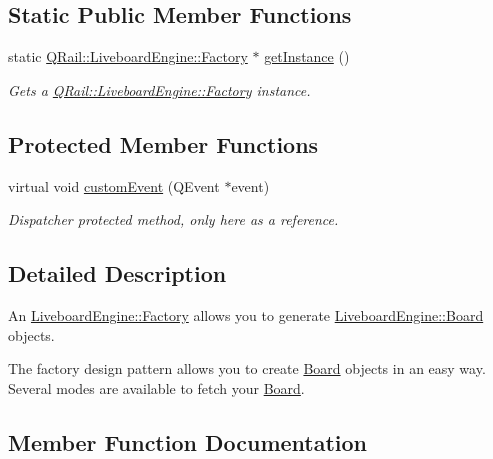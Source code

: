 \subsection*{Static Public Member Functions}
\begin{DoxyCompactItemize}
\item 
static \mbox{\hyperlink{classQRail_1_1LiveboardEngine_1_1Factory}{Q\+Rail\+::\+Liveboard\+Engine\+::\+Factory}} $\ast$ \mbox{\hyperlink{classQRail_1_1LiveboardEngine_1_1Factory_a08e37a6538aad6341edf7066f10a63c7}{get\+Instance}} ()
\begin{DoxyCompactList}\small\item\em Gets a \mbox{\hyperlink{classQRail_1_1LiveboardEngine_1_1Factory}{Q\+Rail\+::\+Liveboard\+Engine\+::\+Factory}} instance. \end{DoxyCompactList}\end{DoxyCompactItemize}
\subsection*{Protected Member Functions}
\begin{DoxyCompactItemize}
\item 
virtual void \mbox{\hyperlink{classQRail_1_1LiveboardEngine_1_1Factory_a214c37703d996797de42151ec41f55b2}{custom\+Event}} (Q\+Event $\ast$event)
\begin{DoxyCompactList}\small\item\em Dispatcher protected method, only here as a reference. \end{DoxyCompactList}\end{DoxyCompactItemize}


\subsection{Detailed Description}
An \mbox{\hyperlink{classQRail_1_1LiveboardEngine_1_1Factory}{Liveboard\+Engine\+::\+Factory}} allows you to generate \mbox{\hyperlink{classQRail_1_1LiveboardEngine_1_1Board}{Liveboard\+Engine\+::\+Board}} objects. 

The factory design pattern allows you to create \mbox{\hyperlink{classQRail_1_1LiveboardEngine_1_1Board}{Board}} objects in an easy way. Several modes are available to fetch your \mbox{\hyperlink{classQRail_1_1LiveboardEngine_1_1Board}{Board}}. 

\subsection{Member Function Documentation}
\mbox{\label{classQRail_1_1LiveboardEngine_1_1Factory_a5a581cb60c12dea0af977ea08c64e0c8}} 
